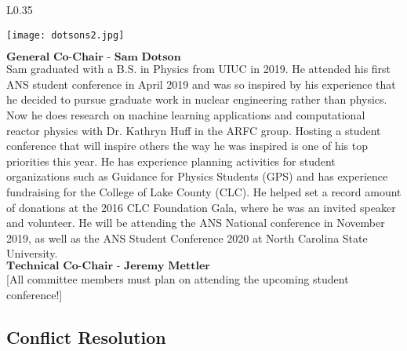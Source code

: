 \setlength\intextsep{0pt}
\begin{wrapfigure}{L}{0.35\textwidth}
	\begin{center}
		\vspace{-\baselineskip}
		\texttt{[image: dotsons2.jpg]}
	\end{center}
\end{wrapfigure}
$\textbf{General Co-Chair - Sam Dotson}$\\
Sam graduated with a B.S. in Physics from UIUC in 2019. He attended his first ANS student conference in April 2019 and was so inspired by his experience that he decided to pursue graduate work in nuclear engineering rather than physics. Now he does research on machine learning applications and computational reactor physics with Dr. Kathryn Huff in the ARFC group. Hosting a student conference that will inspire others the way he was inspired is one of his top priorities this year. He has experience planning activities for student organizations such as Guidance for Physics Students (GPS) and has experience fundraising for the College of Lake County (CLC). He helped set a record amount of donations at the 2016 CLC Foundation Gala, where he was an invited speaker and volunteer. He will be attending the ANS National conference in November 2019, as well as the ANS Student Conference 2020 at North Carolina State University.\\

$\textbf{Technical Co-Chair - Jeremy Mettler}$\\

[All committee members must plan on attending the upcoming student conference!]


\subsection{Conflict Resolution}

